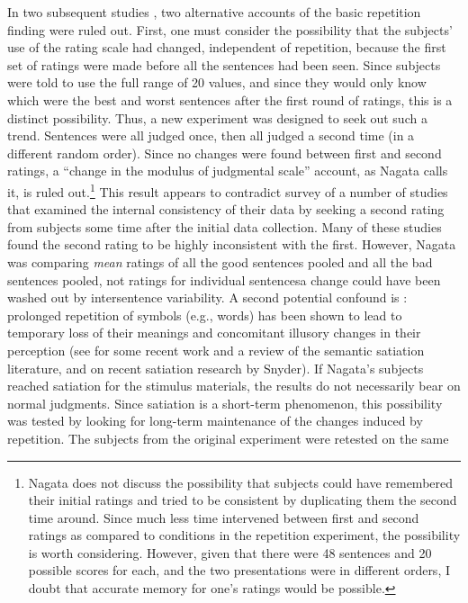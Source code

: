In two subsequent studies \citep{Nagata1987a,Nagata1987b}, two alternative accounts of the basic repetition finding were ruled out. First, one must consider the possibility that the subjects' use of the rating scale had changed, independent of repetition, because the first set of ratings were made before all the sentences had been seen. Since subjects were told to use the full range of 20 values, and since they would only know which were the best and worst sentences after the first round of ratings, this is a distinct possibility. Thus, a new experiment was designed to seek out such a trend. Sentences were all judged once, then all judged a second time (in a different random order). Since no changes were found between first and second ratings, a ``change in the modulus of judgmental scale'' account, as Nagata calls it, is ruled out.\footnote{Nagata does not discuss the possibility that subjects could have remembered their initial ratings and tried to be consistent by duplicating them the second time around. Since much less time intervened between first and second ratings as compared to conditions in the repetition experiment, the possibility is worth considering. However, given that there were 48 sentences and 20 possible scores for each, and the two presentations were in different orders, I doubt that accurate memory for one's ratings would be possible.}
 This result appears to contradict  survey of a number of studies that examined the internal consistency of their data by seeking a second rating from subjects some time after the initial data collection. Many of these studies found the second rating to be highly inconsistent with the first. However, Nagata was comparing \textit{mean} ratings of all the good sentences pooled and all the bad sentences pooled, not ratings for individual sentences\schdash{}a change could have been washed out by intersentence variability. A second potential confound is : prolonged repetition of symbols (e.g., words) has been shown to lead to temporary loss of their meanings and concomitant illusory changes in their perception (see \citet{Pynte1991} for some recent work and a review of the semantic satiation literature, and  on recent satiation research by Snyder). If Nagata's subjects reached satiation for the stimulus materials, the results do not necessarily bear on normal judgments. Since satiation is a short-term phenomenon, this possibility was tested by looking for long-term maintenance of the changes induced by repetition. The subjects from the original experiment were retested on the same
